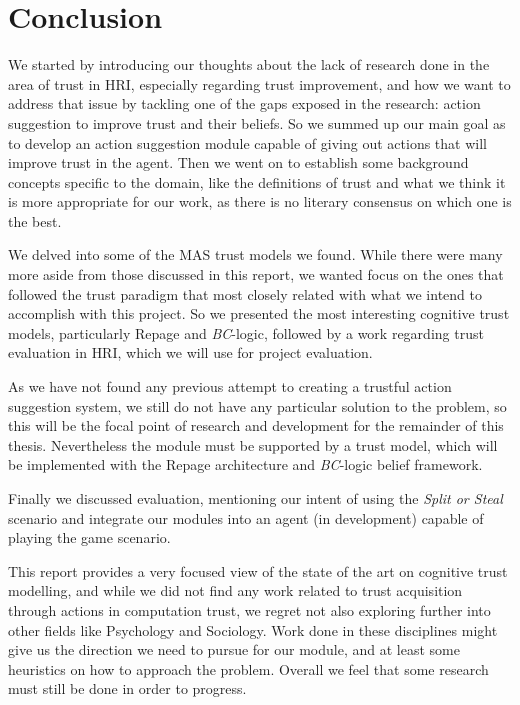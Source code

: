 \section{Conclusion}
\label{sec:Conclusion}
We started by introducing our thoughts about the lack of research done in the area of trust in \ac{HRI}, especially regarding trust improvement, and how we want to address that issue by tackling one of the gaps exposed in the research: action suggestion to improve trust and their beliefs. So we summed up our main goal as to develop an action suggestion module capable of giving out actions that will improve trust in the agent. Then we went on to establish some background concepts specific to the domain, like the definitions of trust and what we think it is more appropriate for our work, as there is no literary consensus on which one is the best. 

We delved into some of the \ac{MAS} trust models we found. While there were many more aside from those discussed in this report, we wanted focus on the ones that followed the trust paradigm that most closely related with what we intend to accomplish with this project. So we presented the most interesting cognitive trust models, particularly Repage and \textit{BC}-logic, followed by a work regarding trust evaluation in \ac{HRI}, which we will use for project evaluation.

As we have not found any previous attempt to creating a trustful action suggestion system, we still do not have any particular solution to the problem, so this will be the focal point of research and development for the remainder of this thesis. Nevertheless the module must be supported by a trust model, which will be implemented with the Repage architecture and \textit{BC}-logic belief framework.

Finally we discussed evaluation, mentioning our intent of using the \textit{Split or Steal} scenario and integrate our modules into an agent (in development) capable of playing the game scenario.

This report provides a very focused view of the state of the art on cognitive trust modelling, and while we did not find any work related to trust acquisition through actions in computation trust, we regret not also exploring further into other fields like Psychology and Sociology. Work done in these disciplines might give us the direction we need to pursue for our module, and at least some heuristics on how to approach the problem. Overall we feel that some research  must still be done in order to progress.